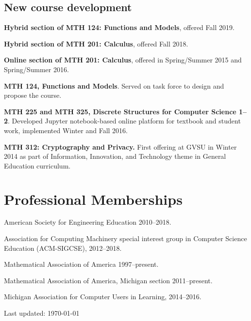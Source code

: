 \documentclass[letterpaper]{article}
\def\footerlink{}
\renewenvironment{itemize}{
  \begin{list}{}{
    \setlength{\leftmargin}{1.5em}
	\setlength{\itemsep}{0in}
  }
}{
  \end{list}
}
\begin{document}
\subsection*{New course development}
\begin{itemize}
	\item \textbf{Hybrid section of MTH 124: Functions and Models}, offered Fall 2019. 
	\item \textbf{Hybrid section of MTH 201: Calculus}, offered Fall 2018. 
	\item \textbf{Online section of MTH 201: Calculus}, offered in Spring/Summer 2015 and Spring/Summer 2016.
	\item \textbf{MTH 124, Functions and Models}. Served on task force to design and propose the course.
	\item \textbf{MTH 225 and MTH 325, Discrete Structures for Computer Science 1--2}. Developed Jupyter notebook-based online platform for textbook and student work, implemented Winter and Fall 2016.
	\item \textbf{MTH 312: Cryptography and Privacy. }First offering at GVSU in Winter 2014 as part of Information, Innovation, and Technology theme in General Education curriculum.
\end{itemize}


\section*{Professional Memberships}
\begin{itemize}
	\item American Society for Engineering Education 2010--2018.
	\item Association for Computing Machinery special interest group in Computer Science Education (ACM-SIGCSE), 2012--2018.
	\item Mathematical Association of America 1997--present.
	\item Mathematical Association of America, Michigan section 2011--present.
	\item Michigan Association for Computer Users in Learning, 2014--2016.
\end{itemize}


\bigskip

\begin{center}
  \begin{footnotesize}
    Last updated: \today \\
  \end{footnotesize}
\end{center}
\end{document}
